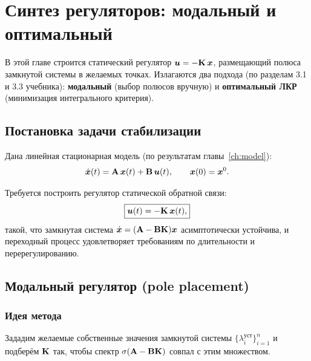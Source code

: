 \chapter{Синтез регуляторов: модальный и оптимальный}
\label{ch:synthesis}

В этой главе строится статический регулятор $\bm{u} = -\mathbf{K}\,\bm{x}$,
размещающий полюса замкнутой системы в желаемых точках.
Излагаются два подхода (по разделам 3.1 и 3.3 учебника):
\textbf{модальный} (выбор полюсов вручную) и
\textbf{оптимальный ЛКР} (минимизация интегрального критерия).

\section{Постановка задачи стабилизации}
\label{sec:stabilization}

Дана линейная стационарная модель (по результатам главы~\ref{ch:model}):
\begin{equation}
  \dot{\bm{x}}(t) = \mathbf{A}\,\bm{x}(t) + \mathbf{B}\,\bm{u}(t),
  \qquad \bm{x}(0) = \bm{x}^0.
  \label{eq:plant_continuous}
\end{equation}

Требуется построить регулятор статической обратной связи:
\begin{equation}
  \boxed{\bm{u}(t) = -\mathbf{K}\,\bm{x}(t),}
  \label{eq:state_feedback}
\end{equation}
такой, что замкнутая система $\dot{\bm{x}} = (\mathbf{A}-\mathbf{B}\mathbf{K})\bm{x}$
асимптотически устойчива, и переходный процесс удовлетворяет требованиям
по длительности и перерегулированию.

\section{Модальный регулятор (pole placement)}
\label{sec:modal}

\subsection{Идея метода}

Зададим желаемые собственные значения замкнутой системы
$\{\lambda_i^{\text{уст}}\}_{i=1}^n$ и подберём $\mathbf{K}$ так,
чтобы спектр $\sigma(\mathbf{A}-\mathbf{B}\mathbf{K})$ совпал с этим множеством.

